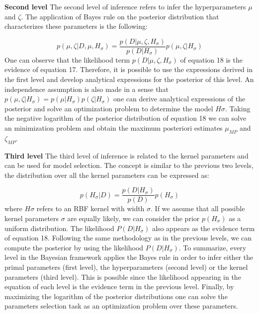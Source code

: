 \documentclass[conference,compsoc]{IEEEtran}
\begin{document}
\textbf{Second level} The second level of inference refers to infer the hyperparameters $\mu$ and $\zeta$. The application of Bayes rule on the posterior distribution that characterizes these parameters is the following:

\begin{equation}
p(\mu,\zeta|D,\mu,H_\sigma) = \frac{p(D|\mu,\zeta,H_\sigma)}{p(D|H_\sigma)}p(\mu,\zeta|H_\sigma)
\end{equation}
One can observe that the likelihood term $p(D|\mu,\zeta,H_\sigma)$ of equation 18 is the evidence of equation 17. Therefore, it is possible to use the expressions derived in the first level and develop analytical expressions for the posterior of this level. An independence assumption is also  made in a sense that $p(\mu,\zeta|H_\sigma) = p(\mu|H_\sigma)p(\zeta|H_\sigma)$ one can derive analytical expressions of the posterior and solve an optimization problem to determine the model $H\sigma$.
Taking the negative logarithm of the posterior distribution of equation 18 we can solve an minimization problem and obtain the maximum posteriori estimates $\mu_{MP}$ and $\zeta_{MP}$.

\textbf{Third level} The third level of inference is related to the kernel parameters and can be used for model selection. The concept is similar to the previous two levels, the distribution over all the kernel parameters can be expressed as:

\begin{equation}
p(H_\sigma|D) = \frac{p(D|H_\sigma)}{p(D)}p(H_\sigma)
\end{equation}
where $H\sigma$ refers to an RBF kernel with width $\sigma$. If we assume that all possible kernel parameters $\sigma$ are equally likely, we can consider the prior $p(H_{\sigma})$ as a uniform distribution. The likelihood $P(D|H_\sigma)$  
also appears as the evidence term of equation 18. Following the same methodology as in the previous levels, we can compute the posterior by using the likelihood $P(D|H_\sigma)$.
To summarize, every level in the Bayesian framework applies the Bayes rule in order to infer either the primal parameters (first level), the hyperparameters (second level) or the kernel parameters (third level). This is possible since the likelihood appearing in the equation of each level is the evidence term in the previous level. Finally, by maximizing the logarithm of the posterior distributions one can solve the parameters selection task as an optimization problem over these parameters. 
\end{document}
